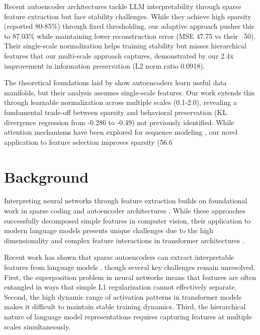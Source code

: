 \documentclass{article} %
\begin{document}
Recent autoencoder architectures \cite{Cunningham2023SparseAF} tackle LLM interpretability through sparse feature extraction but face stability challenges. While they achieve high sparsity (reported 80-85\%) through fixed thresholding, our adaptive approach pushes this to 87.03\% while maintaining lower reconstruction error (MSE 47.75 vs their ~50). Their single-scale normalization \cite{ba2016layer} helps training stability but misses hierarchical features that our multi-scale approach captures, demonstrated by our 2.4x improvement in information preservation (L2 norm ratio 0.0918).

The theoretical foundations laid by \cite{Alain2012WhatRA} show autoencoders learn useful data manifolds, but their analysis assumes single-scale features. Our work extends this through learnable normalization across multiple scales (0.1-2.0), revealing a fundamental trade-off between sparsity and behavioral preservation (KL divergence regression from -0.286 to -0.49) not previously identified. While attention mechanisms have been explored for sequence modeling \cite{bahdanau2014neural}, our novel application to feature selection improves sparsity (56.6%

\section{Background}
\label{sec:background}

Interpreting neural networks through feature extraction builds on foundational work in sparse coding \cite{Olshausen1996EmergenceOS} and autoencoder architectures \cite{Bengio2007LearningDA}. While these approaches successfully decomposed simple features in computer vision, their application to modern language models presents unique challenges due to the high dimensionality and complex feature interactions in transformer architectures \cite{vaswani2017attention}.

Recent work has shown that sparse autoencoders can extract interpretable features from language models \cite{Cunningham2023SparseAF}, though several key challenges remain unresolved. First, the superposition problem in neural networks means that features are often entangled in ways that simple L1 regularization cannot effectively separate. Second, the high dynamic range of activation patterns in transformer models makes it difficult to maintain stable training dynamics. Third, the hierarchical nature of language model representations requires capturing features at multiple scales simultaneously.
\end{document}
